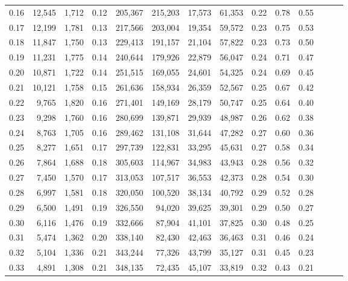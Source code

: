 \begin{tabular}{rrrrrrrrrrrrrr}
0.16 &  12,545 &  1,712 &  0.12 &  205,367 &  215,203 &  17,573 &  61,353 &  0.22 &  0.78 &      0.55 \\
0.17 &  12,199 &  1,781 &  0.13 &  217,566 &  203,004 &  19,354 &  59,572 &  0.23 &  0.75 &      0.53 \\
0.18 &  11,847 &  1,750 &  0.13 &  229,413 &  191,157 &  21,104 &  57,822 &  0.23 &  0.73 &      0.50 \\
0.19 &  11,231 &  1,775 &  0.14 &  240,644 &  179,926 &  22,879 &  56,047 &  0.24 &  0.71 &      0.47 \\
0.20 &  10,871 &  1,722 &  0.14 &  251,515 &  169,055 &  24,601 &  54,325 &  0.24 &  0.69 &      0.45 \\
0.21 &  10,121 &  1,758 &  0.15 &  261,636 &  158,934 &  26,359 &  52,567 &  0.25 &  0.67 &      0.42 \\
0.22 &   9,765 &  1,820 &  0.16 &  271,401 &  149,169 &  28,179 &  50,747 &  0.25 &  0.64 &      0.40 \\
0.23 &   9,298 &  1,760 &  0.16 &  280,699 &  139,871 &  29,939 &  48,987 &  0.26 &  0.62 &      0.38 \\
0.24 &   8,763 &  1,705 &  0.16 &  289,462 &  131,108 &  31,644 &  47,282 &  0.27 &  0.60 &      0.36 \\
0.25 &   8,277 &  1,651 &  0.17 &  297,739 &  122,831 &  33,295 &  45,631 &  0.27 &  0.58 &      0.34 \\
0.26 &   7,864 &  1,688 &  0.18 &  305,603 &  114,967 &  34,983 &  43,943 &  0.28 &  0.56 &      0.32 \\
0.27 &   7,450 &  1,570 &  0.17 &  313,053 &  107,517 &  36,553 &  42,373 &  0.28 &  0.54 &      0.30 \\
0.28 &   6,997 &  1,581 &  0.18 &  320,050 &  100,520 &  38,134 &  40,792 &  0.29 &  0.52 &      0.28 \\
0.29 &   6,500 &  1,491 &  0.19 &  326,550 &   94,020 &  39,625 &  39,301 &  0.29 &  0.50 &      0.27 \\
0.30 &   6,116 &  1,476 &  0.19 &  332,666 &   87,904 &  41,101 &  37,825 &  0.30 &  0.48 &      0.25 \\
0.31 &   5,474 &  1,362 &  0.20 &  338,140 &   82,430 &  42,463 &  36,463 &  0.31 &  0.46 &      0.24 \\
0.32 &   5,104 &  1,336 &  0.21 &  343,244 &   77,326 &  43,799 &  35,127 &  0.31 &  0.45 &      0.23 \\
0.33 &   4,891 &  1,308 &  0.21 &  348,135 &   72,435 &  45,107 &  33,819 &  0.32 &  0.43 &      0.21 \\

\end{tabular}
